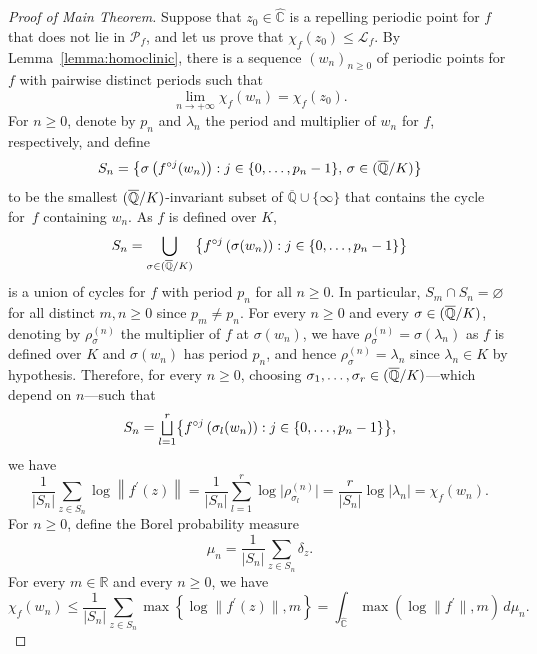 \documentclass[11pt]{article}
\newcommand{\NoChangel}[1]{%
\expandafter\let\csname old\string#1\endcsname=#1
\let#1=\relax
\newcommand{#1}{\mathcode`l="716C\csname old\string#1\endcsname\mathcode`l="7160 }%
}
\let\oldbigsqcup\bigsqcup
\renewcommand{\bigsqcup}{\mathop{\textstyle\oldbigsqcup}\displaylimits}
\theoremstyle{plain}
\theoremstyle{definition}
\theoremstyle{remark}
\DeclareMathOperator{\Gal}{Gal}\NoChangel{\Gal}
\begin{document}
\begin{proof}[Proof of Main Theorem]
Suppose that $z_{0} \in \widehat{\mathbb{C}}$ is a repelling periodic point for $f$ that does not lie in $\mathcal{P}_{f}$, and let us prove that $\chi_{f}(z_{0}) \leq \mathcal{L}_{f}$. By Lemma~\ref{lemma:homoclinic}, there is a sequence $(w_{n})_{n \geq 0}$ of periodic points for $f$ with pairwise distinct periods such that
\[
\lim_{n \to +\infty} \chi_{f}(w_{n}) = \chi_{f}(z_{0}).
\]
For $n \geq 0$, denote by $p_{n}$ and $\lambda_{n}$ the period and multiplier of $w_{n}$ for $f$, respectively, and define
\[
S_{n} = \bigl\lbrace \sigma\left(f^{\circ j}(w_{n}) \right) : j \in\lbrace 0, \dotsc, p_{n} -1\rbrace, \, \sigma \in \Gal(\overline{\mathbb{Q}}/K) \bigr\rbrace
\]
to be the smallest $\Gal(\overline{\mathbb{Q}}/K)$\nobreakdash-invariant subset of $\overline{\mathbb{Q}} \cup \lbrace \infty \rbrace$ that contains the cycle for~$f$ containing $w_{n}$. As $f$ is defined over $K$,
\[
S_{n} = \bigcup_{\sigma \in \Gal(\overline{\mathbb{Q}}/K)} \left\lbrace f^{\circ j}\left(\sigma(w_{n}) \right) : j \in\lbrace 0, \dotsc, p_{n} -1\rbrace \right\rbrace
\]
is a union of cycles for $f$ with period $p_{n}$ for all $n \geq 0$. In particular, $S_{m} \cap S_{n} = \varnothing$ for all distinct $m, n \geq 0$ since $p_{m} \neq p_{n}$. For every $n \geq 0$ and every $\sigma \in \Gal(\overline{\mathbb{Q}}/K)$, denoting by $\rho_{\sigma}^{(n)}$ the multiplier of $f$ at $\sigma(w_{n})$, we have $\rho_{\sigma}^{(n)} = \sigma\left(\lambda_{n} \right)$ as $f$ is defined over $K$ and $\sigma(w_{n})$ has period $p_{n}$, and hence $\rho_{\sigma}^{(n)} = \lambda_{n}$ since $\lambda_{n} \in K$ by hypothesis. Therefore, for every $n \geq 0$, choosing $\sigma_{1}, \dotsc, \sigma_{r} \in \Gal(\overline{\mathbb{Q}}/K)$---which depend on $n$---such that
\[
S_{n} = \bigsqcup_{l = 1}^{r} \bigl\lbrace f^{\circ j}\left(\sigma_{l}(w_{n}) \right) : j \in \left\lbrace 0, \dotsc, p_{n} -1 \right\rbrace \bigr\rbrace,
\]
we have
\[
\frac{1}{\left\lvert S_{n} \right\rvert} \sum_{z \in S_{n}} \log\left\lVert f^{\prime}(z) \right\rVert = \frac{1}{\left\lvert S_{n} \right\rvert} \sum_{l = 1}^{r} \log\vert \rho_{\sigma_{l}}^{(n)}\vert = \frac{r}{\left\lvert S_{n} \right\rvert} \log\left\lvert \lambda_{n} \right\rvert = \chi_{f}(w_{n}).
\]
For $n \geq 0$, define the Borel probability measure
\[
\mu_{n} = \frac{1}{\left\lvert S_{n} \right\rvert} \sum_{z \in S_{n}} \delta_{z}.
\]
For every $m \in \mathbb{R}$ and every $n \geq 0$, we have
\[
\chi_{f}(w_{n}) \leq \frac{1}{\left\lvert S_{n} \right\rvert} \sum_{z \in S_{n}} \max\left\lbrace \log\lVert f^{\prime}(z)\rVert, m \right\rbrace = \int_{\widehat{\mathbb{C}}} \max\left(\log\lVert f^{\prime}\rVert, m \right) \, d\mu_{n}.
\]
\end{proof}
\end{document}
